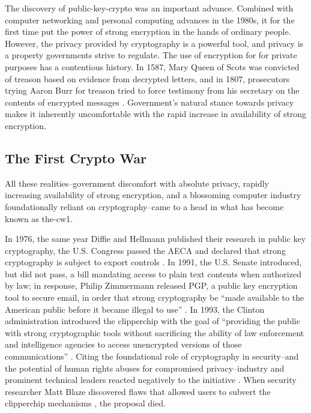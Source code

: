 The discovery of \ac{public-key-crypto} was an important advance. Combined with computer networking and personal
computing advances in the 1980s, it for the first time put the power of strong encryption in the hands of ordinary
people. However, the privacy provided by cryptography is a powerful tool, and privacy is a property governments strive
to regulate. The use of encryption for for private purposes has a contentious history. In 1587, Mary Queen of Scots was
convicted of treason based on evidence from decrypted letters, and in 1807, prosecutors trying Aaron Burr for treason
tried to force testimony from his secretary on the contents of encrypted messages \cite{kerr_encryption_2017}.
Government's natural stance towards privacy makes it inherently uncomfortable with the rapid increase in availability of
strong encryption.


\subsection{The First Crypto War}
\label{sec-history-cw1}

All these realities--government discomfort with absolute privacy, rapidly increasing availability of strong encryption,
and a blossoming computer industry foundationally reliant on cryptography--came to a head in what has become known as
\ac{the-cw1}.

In 1976, the same year Diffie and Hellmann published their research in public key cryptography, the U.S. Congress passed
the \ac{AECA} and declared that strong cryptography is subject to export controls \cite{kehl_right_2015}. In 1991, the
U.S. Senate introduced, but did not pass, a bill mandating access to plain text contents when authorized by law; in
response, Philip Zimmermann released \ac{PGP}, a public key encryption tool to secure email, in order that strong
cryptography be ``made available to the American public before it became illegal to use'' \cite{zimmermann_1996}. In
1993, the Clinton administration introduced the \ac{clipperchip} \cite{press_1993} with the goal of ``providing the
public with strong cryptographic tools without sacrificing the ability of law enforcement and intelligence agencies to
access unencrypted versions of those communications'' \cite{thompson_2015}. Citing the foundational role of cryptography
in security--and the potential of human rights abuses for compromised privacy--industry and prominent technical leaders
reacted negatively to the initiative \cite{kehl_right_2015} \cite{zimmermann_1996}. When security researcher Matt Blaze
discovered flaws that allowed users to subvert the \ac{clipperchip} mechanisms \cite{blaze_protocol_1994}, the proposal
died.


